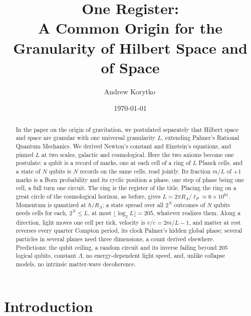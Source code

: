 \documentclass[aps,prd,twocolumn,superscriptaddress,nofootinbib]{revtex4-2}
\begin{document}
\title{One Register:\\ A Common Origin for the Granularity of Hilbert Space and of Space}

\author{Andrew Korytko\,}

\date{\today}

\begin{abstract}
In the paper on the origin of gravitation, we postulated separately that Hilbert space and space are granular with one universal granularity $L$, extending Palmer's Rational Quantum Mechanics. We derived Newton's constant and Einstein's equations, and pinned $L$ at two scales, galactic and cosmological. Here the two axioms become one postulate: a qubit is a record of marks, one at each cell of a ring of $L$ Planck cells, and a state of $N$ qubits is $N$ records on the same cells, read jointly. Its fraction $m/L$ of $+1$ marks is a Born probability and its cyclic position a phase, one step of phase being one cell, a full turn one circuit. The ring is the register of the title. Placing the ring on a great circle of the cosmological horizon, as before, gives $L = 2\pi R_\Lambda/\ell_P \approx 6\times10^{61}$. Momentum is quantized at $\hbar/R_\Lambda$; a state spread over all $2^N$ outcomes of $N$ qubits needs cells for each, $2^N \le L$, at most $\lfloor\log_2 L\rfloor = 205$, whatever realizes them. Along a direction, light moves one cell per tick, velocity is $v/c = 2m/L - 1$, and matter at rest reverses every quarter Compton period, its clock Palmer's hidden global phase; several particles in several planes need three dimensions, a count derived elsewhere. Predictions: the qubit ceiling, a random circuit and its inverse failing beyond 205 logical qubits, constant $\Lambda$, no energy-dependent light speed, and, unlike collapse models, no intrinsic matter-wave decoherence.

\end{abstract}


\maketitle

\section{Introduction}
\label{sec:intro}
\end{document}
